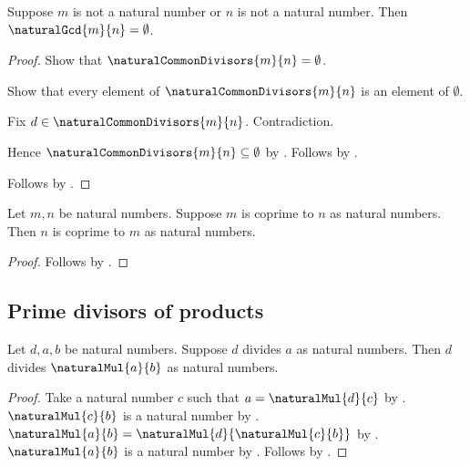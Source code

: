 \begin{proposition}\label{natural_gcd_off_domain}
    Suppose $m$ is not a natural number or $n$ is not a natural number.
    Then $\naturalGcd{m}{n}=\emptyset$.
\end{proposition}
\begin{proof}
    Show that $\naturalCommonDivisors{m}{n}=\emptyset$.
    \begin{subproof}
        Show that every element of $\naturalCommonDivisors{m}{n}$
            is an element of $\emptyset$.
        \begin{subproof}
            Fix $d\in\naturalCommonDivisors{m}{n}$.
            Contradiction.
        \end{subproof}
        Hence $\naturalCommonDivisors{m}{n}\subseteq\emptyset$ by
            .
        Follows by .
    \end{subproof}
    Follows by .
\end{proof}

\begin{proposition}\label{coprime_naturals_symmetric}
    Let $m,n$ be natural numbers.
    Suppose $m$ is coprime to $n$ as natural numbers.
    Then $n$ is coprime to $m$ as natural numbers.
\end{proposition}
\begin{proof}
    Follows by
        .
\end{proof}

\subsection{Prime divisors of products}

\begin{proposition}\label{divisor_divides_multiple}
    Let $d,a,b$ be natural numbers.
    Suppose $d$ divides $a$ as natural numbers.
    Then $d$ divides $\naturalMul{a}{b}$ as natural numbers.
\end{proposition}
\begin{proof}
    Take a natural number $c$ such that $a=\naturalMul{d}{c}$
        by .
    $\naturalMul{c}{b}$ is a natural number
        by .
    $\naturalMul{a}{b}=\naturalMul{d}{\naturalMul{c}{b}}$
        by .
    $\naturalMul{a}{b}$ is a natural number
        by .
    Follows by .
\end{proof}

